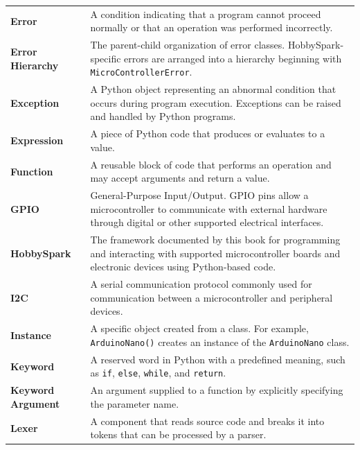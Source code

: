 \documentclass[11pt]{book}
\begin{document}
\begin{longtable}{p{} p{}}
    \textbf{Error} &
    A condition indicating that a program cannot proceed normally or that an operation was performed incorrectly. \\

    \textbf{Error Hierarchy} &
    The parent-child organization of error classes. HobbySpark-specific errors are arranged into a hierarchy beginning with \texttt{MicroControllerError}. \\

    \textbf{Exception} &
    A Python object representing an abnormal condition that occurs during program execution. Exceptions can be raised and handled by Python programs. \\

    \textbf{Expression} &
    A piece of Python code that produces or evaluates to a value. \\

    \textbf{Function} &
    A reusable block of code that performs an operation and may accept arguments and return a value. \\

    \textbf{GPIO} &
    General-Purpose Input/Output. GPIO pins allow a microcontroller to communicate with external hardware through digital or other supported electrical interfaces. \\

    \textbf{HobbySpark} &
    The framework documented by this book for programming and interacting with supported microcontroller boards and electronic devices using Python-based code. \\

    \textbf{I2C} &
    A serial communication protocol commonly used for communication between a microcontroller and peripheral devices. \\

    \textbf{Instance} &
    A specific object created from a class. For example, \texttt{ArduinoNano()} creates an instance of the \texttt{ArduinoNano} class. \\

    \textbf{Keyword} &
    A reserved word in Python with a predefined meaning, such as \texttt{if}, \texttt{else}, \texttt{while}, and \texttt{return}. \\

    \textbf{Keyword Argument} &
    An argument supplied to a function by explicitly specifying the parameter name. \\

    \textbf{Lexer} &
    A component that reads source code and breaks it into tokens that can be processed by a parser. \\


\end{longtable}
\end{document}
